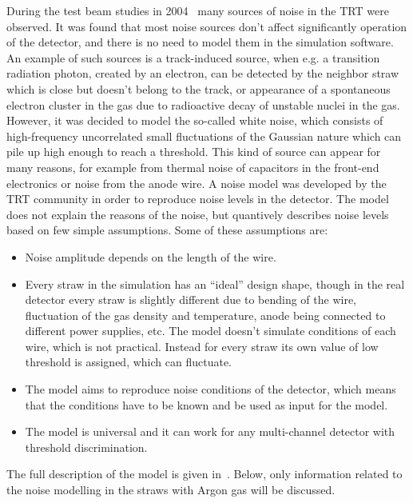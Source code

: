 During the test beam studies in 2004~\cite{trt_test_beam} many sources of noise in the TRT were observed.
It was found that most noise sources don't affect significantly operation of the detector, and there is no need to model them in the simulation software.
An example of such sources is a track-induced source, when e.g. a transition radiation photon, created by an electron, can be detected by the neighbor straw which is close 
but doesn't belong to the track, or appearance of a spontaneous electron cluster in the gas due to radioactive decay of unstable nuclei in the gas.
However, it was decided to model the so-called white noise, which consists of high-frequency uncorrelated small fluctuations of the Gaussian nature which 
can pile up high enough to reach a threshold. This kind of source can appear for many reasons, for example from thermal noise of capacitors in the front-end electronics
or noise from the anode wire. A noise model was developed by the TRT community in order to reproduce noise levels in the detector.
The model does not explain the reasons of the noise, but quantively describes noise levels based on few simple assumptions.
Some of these assumptions are:
\begin{itemize}
 \item Noise amplitude depends on the length of the wire.
 \item Every straw in the simulation has an ``ideal'' design shape, though in the real detector every straw is slightly different due to bending of the wire, 
 fluctuation of the gas  density and temperature, anode being connected to different power supplies, etc. The model doesn't simulate conditions of each wire, 
 which is not practical. 
 Instead for every straw its own value of low threshold is assigned, which can fluctuate.
 \item The model aims to reproduce noise conditions of the detector, which means that the conditions have to be known and be used as input for the model.
 \item The model is universal and it can work for any multi-channel detector with threshold discrimination.
\end{itemize}
The full description of the model is given in~\cite{kittelmann_thesis}. 
Below, only information related to the noise modelling in the straws with Argon gas will be discussed.

